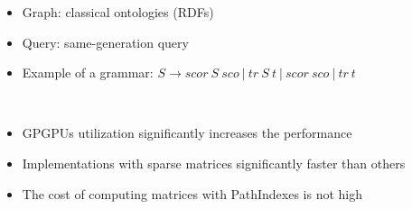 \documentclass[a0paper,portrait]{baposter}
\begin{document}
\begin{poster}
{\begin{minipage}[t]{0.5\textwidth}
	\vspace{0.05cm}
	\begin{itemize}
		\item Graph: classical ontologies (RDFs)
		\item Query: same-generation query
		\item Example of a grammar: $S \to \textit{scor} \ S \ \textit{sco} \ | \ \textit{tr} \ S \ \textit{t} \ | \ \textit{scor} \ \textit{sco} \ | \ \textit{tr} \ \textit{t}$
	\end{itemize}
\end{minipage}
~
\begin{minipage}[t]{0.48\textwidth}
\vspace{0.05cm}
  \begin{itemize}
  	\item GPGPUs utilization significantly increases the performance
  	\item Implementations with sparse matrices significantly faster than others
  	\item The cost of computing matrices with PathIndexes is not high
  \end{itemize}
\end{minipage}
}



\end{poster}
\end{document}
